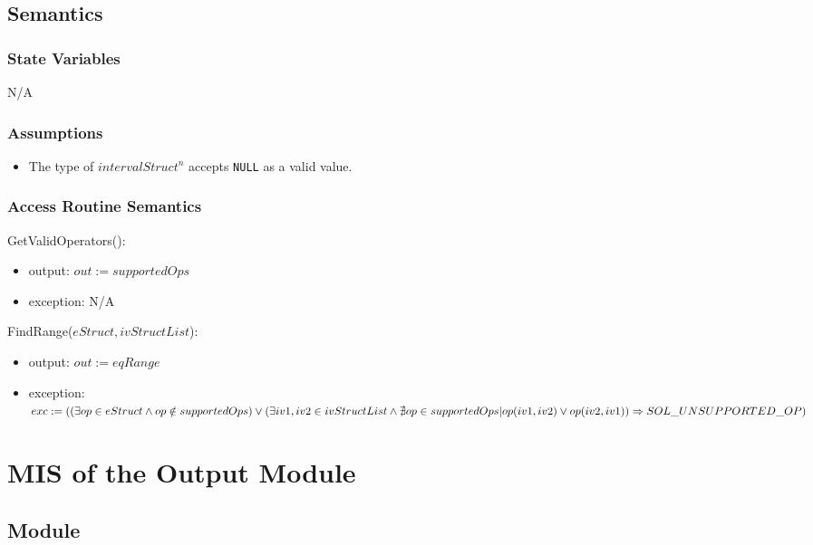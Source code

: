 \documentclass[12pt, titlepage]{article}
\begin{document}
\subsection{Semantics}

\subsubsection{State Variables}

N/A

\subsubsection{Assumptions}

\begin{itemize}
	\item The type of $intervalStruct^n$ accepts \texttt{NULL} as a valid value.
\end{itemize}

\subsubsection{Access Routine Semantics}

\noindent GetValidOperators():
\begin{itemize}
	\item output: $out := supportedOps$
	\item exception: N/A
\end{itemize}

\noindent FindRange($eStruct, ivStructList$):
\begin{itemize}
	\item output: $out := eqRange$
	\item exception: $exc := \\
	((\exists op \in eStruct \wedge op \notin supportedOps) \\
	\vee (\exists iv1, iv2 \in ivStructList \wedge \nexists op \in supportedOps 
	| op(iv1, iv2) \vee op(iv2, iv1)) \\
	\Rightarrow SOL\_UNSUPPORTED\_OP)$ 
\end{itemize}

\newpage

\section{MIS of the Output Module} 
\label{Module_output}

\subsection{Module}
\end{document}
